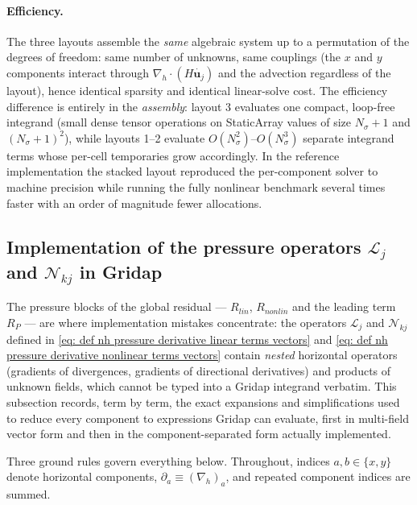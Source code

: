 \documentclass{article}
\newcommand{\Ns}{N_\sigma}
\newcommand{\uj}{\mathbf{u}_j}
\newcommand{\nablah}{\nabla_h}
\begin{document}
\paragraph{Efficiency.}
The three layouts assemble the \emph{same} algebraic system up to a permutation of the degrees of freedom: same number of unknowns, same couplings (the $x$ and $y$ components interact through $\nablah\cdot(H\dot{\uj})$ and the advection regardless of the layout), hence identical sparsity and identical linear-solve cost. The efficiency difference is entirely in the \emph{assembly}: layout 3 evaluates one compact, loop-free integrand (small dense tensor operations on StaticArray values of size $\Ns+1$ and $(\Ns+1)^2$), while layouts 1–2 evaluate $O(\Ns^2)$–$O(\Ns^3)$ separate integrand terms whose per-cell temporaries grow accordingly. In the reference implementation the stacked layout reproduced the per-component solver to machine precision while running the fully nonlinear benchmark several times faster with an order of magnitude fewer allocations.




\subsection*{Implementation of the pressure operators $\mathcal{L}_j$ and $\mathcal{N}_{kj}$ in Gridap}

The pressure blocks of the global residual — $R_{lin}$, $R_{nonlin}$ and the leading term $R_P$ — are where implementation mistakes concentrate: the operators $\mathcal{L}_j$ and $\mathcal{N}_{kj}$ defined in \eqref{eq: def nh pressure derivative linear terms vectors} and \eqref{eq: def nh pressure derivative nonlinear terms vectors} contain \emph{nested} horizontal operators (gradients of divergences, gradients of directional derivatives) and products of unknown fields, which cannot be typed into a Gridap integrand verbatim. This subsection records, term by term, the exact expansions and simplifications used to reduce every component to expressions Gridap can evaluate, first in multi-field vector form and then in the component-separated form actually implemented.

Three ground rules govern everything below. Throughout, indices $a,b \in \{x, y\}$ denote horizontal components, $\partial_a \equiv (\nablah)_a$, and repeated component indices are summed.
\end{document}
